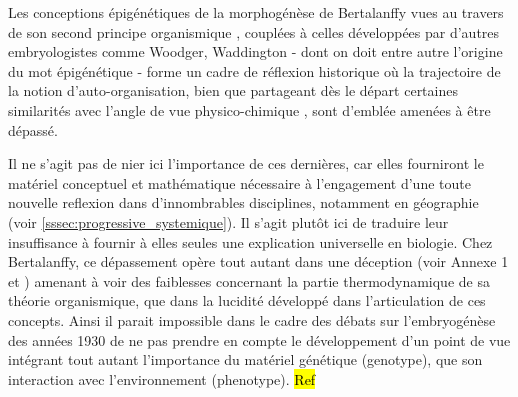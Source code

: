 

Les conceptions épigénétiques de la morphogénèse de Bertalanffy vues au travers de son second principe organismique , couplées à celles développées par d'autres embryologistes comme Woodger, Waddington - dont on doit entre autre l'origine du mot épigénétique -  forme un cadre de réflexion historique où la trajectoire de la notion d'auto-organisation, bien que partageant dès le départ certaines similarités avec l'angle de vue physico-chimique \autocite{Prigogine1946}, sont d'emblée amenées à être dépassé. 

Il ne s'agit pas de nier ici l'importance de ces dernières, car elles fourniront le matériel conceptuel et mathématique nécessaire à l'engagement d'une toute nouvelle reflexion dans d'innombrables disciplines, notamment en géographie (voir \ref{sssec:progressive_systemique}). Il s'agit plutôt ici de traduire leur insuffisance à fournir à elles seules une explication universelle en biologie. Chez Bertalanffy, ce dépassement opère tout autant dans une déception (voir Annexe 1 et \autocite[657-661]{Pouvreau2013}) amenant à voir des faiblesses concernant la partie thermodynamique de sa théorie organismique, que dans la lucidité développé dans l'articulation de ces concepts. Ainsi il parait impossible dans le cadre des débats sur l'embryogénèse des années 1930 de ne pas prendre en compte le développement d'un point de vue intégrant tout autant l'importance du matériel génétique (genotype), que son interaction avec l'environnement (phenotype). \hl{Ref}

